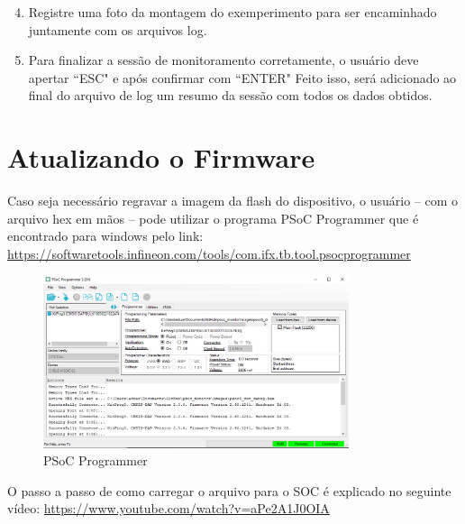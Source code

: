 \documentclass[12pt, a4paper]{article}
\begin{document}
\begin{enumerate}[leftmargin=1.3cm]
    \setcounter{enumi}{3}

    \item Registre uma foto da montagem do exemperimento para ser encaminhado juntamente com os arquivos log.

    \item Para finalizar a sessão de monitoramento corretamente, o usuário deve apertar ``ESC" e após confirmar com ``ENTER"  Feito isso, será adicionado ao final do arquivo de log um resumo da sessão com todos os dados obtidos. 
\end{enumerate}

\section{Atualizando o Firmware}

Caso seja necessário regravar a imagem da flash do dispositivo, o usuário -- com o arquivo hex em mãos -- pode utilizar o programa PSoC Programmer que é encontrado para windows pelo link: \url{https://softwaretools.infineon.com/tools/com.ifx.tb.tool.psocprogrammer}

\begin{figure}[H]
    \centering
    \caption{PSoC Programmer}
    \includegraphics[width=0.8\textwidth]{../imgs/psoc_programmer.png}

    \vspace{0.5em}
    \label{fig:psoc_programmer}
\end{figure}

O passo a passo de como carregar o arquivo para o SOC é explicado no seguinte vídeo: \url{https://www.youtube.com/watch?v=aPe2A1J0OIA}
\end{document}
